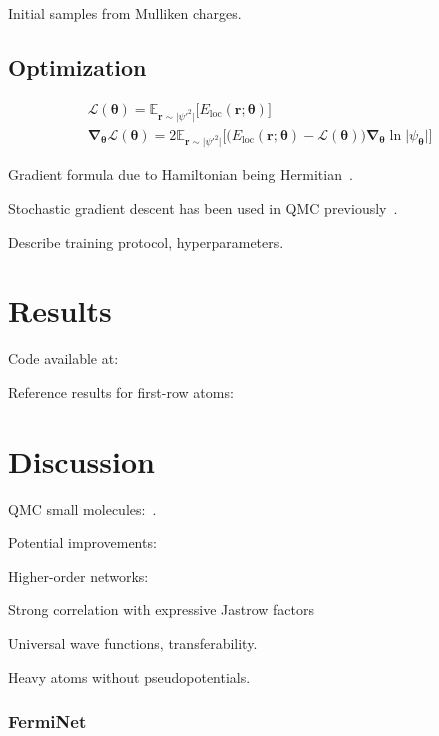 Initial samples from Mulliken charges.

\subsection{Optimization}

\begin{equation}
\begin{gathered}
\mathcal L(\boldsymbol\theta)
  =\mathbb E_{\mathbf r\sim\lvert\psi'^2\rvert}
  \big[E_\text{loc}(\mathbf r;\boldsymbol\theta)\big] \\
\boldsymbol\nabla_{\boldsymbol\theta}\mathcal L(\boldsymbol\theta)
  =2\mathbb E_{\mathbf r\sim\lvert\psi'^2\rvert}\big[
    \big(E_\text{loc}(\mathbf r;\boldsymbol\theta)
    -\mathcal L(\boldsymbol\theta)\big)
    \boldsymbol\nabla_{\boldsymbol\theta}\ln\lvert\psi_{\boldsymbol\theta}\rvert
  \big]
\end{gathered}
\end{equation}

Gradient formula due to Hamiltonian being Hermitian~\citep{CeperleyPRB77}.

Stochastic gradient descent has been used in QMC previously~\citep{HarjuPRL97}.

Describe training protocol, hyperparameters.

\section{Results}

Code available at:

Reference results for first-row atoms:~\cite{SethJCP11}

\section{Discussion}

QMC small molecules:~\cite{NemecJCP10}.

Potential improvements:

Higher-order networks:~\cite{ThomasAC18}

Strong correlation with expressive Jastrow factors~\cite{GoetzJCTC17}

Universal wave functions, transferability.

Heavy atoms without pseudopotentials.

\subsubsection{FermiNet}

